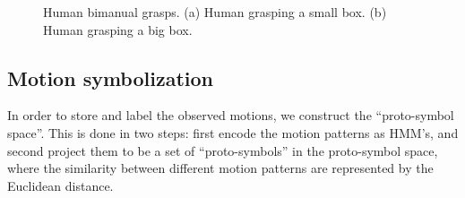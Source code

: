 \begin{figure}
\centering
  \caption{  {Human bimanual grasps. (a) Human grasping a small box. (b) Human grasping a big box.}}
  \label{fig:bimanual}
\end{figure}


\subsection{Motion symbolization}
\label{cha5:sec2:symbolization}
In order to store and label the observed motions, we construct the ``proto-symbol space''. This is done in two steps: first encode the motion patterns as HMM's, and second project them to be a set of ``proto-symbols'' in the proto-symbol space, where the similarity between different motion patterns are represented by the Euclidean distance.

